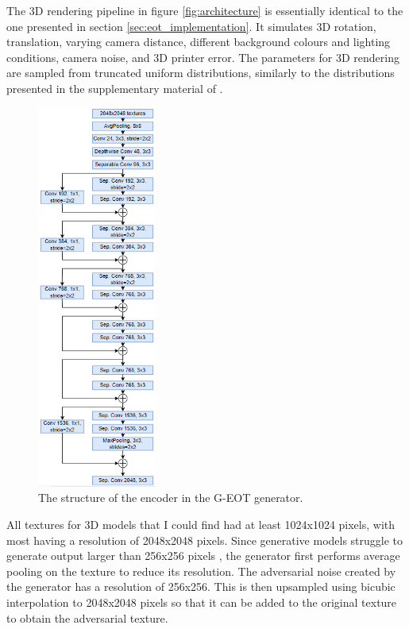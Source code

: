 The 3D rendering pipeline in figure \ref{fig:architecture} is essentially identical to the one presented in section \ref{sec:eot_implementation}. It simulates 3D rotation, translation, varying camera distance, different background colours and lighting conditions, camera noise, and 3D printer error. The parameters for 3D rendering are sampled from truncated uniform distributions, similarly to the distributions presented in the supplementary material of \cite{athalye}. 

\begin{figure}
    \centering
    \includegraphics[width=0.35\textwidth]{graphics/g_eot_encoder.PNG}
    \caption{The structure of the encoder in the G-EOT generator.}
    \label{fig:proposed_encoder}
\end{figure}

All textures for 3D models that I could find had at least 1024x1024 pixels, with most having a resolution of 2048x2048 pixels. Since generative models struggle to generate output larger than 256x256 pixels \cite{big_gan}, the generator first performs average pooling on the texture to reduce its resolution. The adversarial noise created by the generator has a resolution of 256x256. This is then upsampled using bicubic interpolation to 2048x2048 pixels so that it can be added to the original texture to obtain the adversarial texture.


